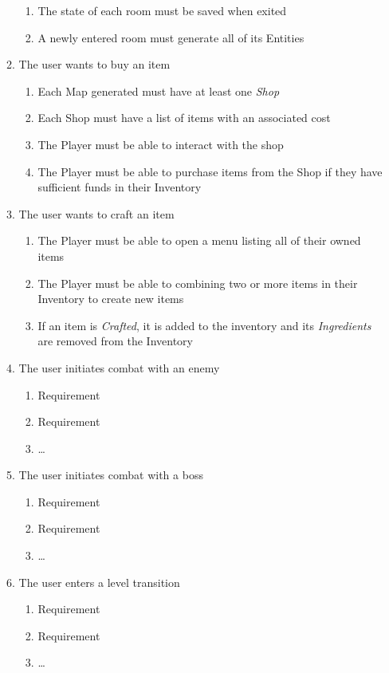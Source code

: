 \documentclass[12pt, titlepage]{article}
\begin{document}
\begin{enumerate}[{VP}1.]
\begin{enumerate}[{BE1}.1]
\begin{enumerate}
      \item The state of each room must be saved when exited
      \item A newly entered room must generate all of its Entities
    \end{enumerate}
    \item The user wants to buy an item
    \begin{enumerate}
      \item Each Map generated must have at least one \textit{Shop}
      \item Each Shop must have a list of items with an associated cost
      \item The Player must be able to interact with the shop
      \item The Player must be able to purchase items from the Shop if they have sufficient funds in their Inventory
    \end{enumerate}
    \item The user wants to craft an item
    \begin{enumerate}
      \item The Player must be able to open a menu listing all of their owned items
      \item The Player must be able to combining two or more items in their Inventory to create new items
      \item If an item is \textit{Crafted}, it is added to the inventory and its \textit{Ingredients} are removed from the Inventory
    \end{enumerate}
    \item The user initiates combat with an enemy
    \begin{enumerate}
      \item Requirement
      \item Requirement
      \item \dots
    \end{enumerate}
    \item The user initiates combat with a boss
    \begin{enumerate}
      \item Requirement
      \item Requirement
      \item \dots
    \end{enumerate}
    \item The user enters a level transition
    \begin{enumerate}
      \item Requirement
      \item Requirement
      \item \dots
    \end{enumerate}
  \end{enumerate}
\end{enumerate}
\end{document}
